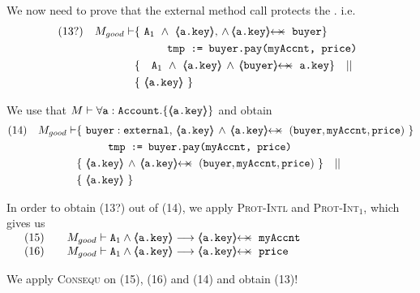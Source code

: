 \begin{proofO}

 

We now need to prove that the external method call  protects the . i.e.
\begin{align*}
\text{(13?)} \ \ \ M_{good} \vdash & \{ \ \Alocalsb \   \wedge\    {\inside{\prg{a.key}}},\, \wedge\, \protectedFrom {\prg{a.key}} {\prg{buyer}}  \} \\
		  		& \SPT  \prg{tmp := buyer.pay(myAccnt, price)}\ \\  
		  		& \{ \ \ \ \Alocalsb \ \wedge\ {\inside{\prg{a.key}}} \, \wedge\, \protectedFrom{\prg{buyer}} {\prg{a.key}} \} \ \ \  || \ \ \  \\
		  		&   \{ \   {\inside{\prg{a.key}}}\  \}
\end{align*}
\normalsize

We use that $M \vdash \forall {\mbox{\normalfont{\texttt{a}}}:\mbox{\normalfont{\texttt{Account}}}}.{{\{}}{\langle\!\!\langle \mbox{\normalfont{\texttt{a.key}}} \rangle\!\!\rangle}{{\}}}$
 and  obtain
 \\
 \small
\begin{align*}
\text{(14)} \ \ \ M_{good} \vdash & \{ \ \prg{buyer}:\prg{external},\,  {\inside{\prg{a.key}}} \, \wedge\, 
\protectedFrom {\prg{a.key}} {(\prg{buyer},\prg{myAccnt},\prg{price})} \  \} \\
		  		& \SPT  \prg{tmp := buyer.pay(myAccnt, price)}\ \\  
		  		& \{ \ \inside{\prg{a.key}} \, \wedge\, 
\protectedFrom {\prg{a.key}} {(\prg{buyer},\prg{myAccnt},\prg{price})}\ \} \ \ \  || \ \ \  \\
		  		&   \{ \   {\inside{\prg{a.key}}}\  \}
\end{align*}
\normalsize 
 
In order to obtain (13?) out of (14), we apply \textsc{Prot-Intl} and \textsc{Prot-Int}$_1$,   which gives us\\
$
\begin{array}{llll}
& (15) & & M_{good} \vdash \Alocalsb \wedge  {\inside{\prg{a.key}}}  \longrightarrow \protectedFrom {\prg{a.key}} {\prg{myAccnt}} 
\\
& (16) & & M_{good} \vdash \Alocalsb \wedge  {\inside{\prg{a.key}}}  \longrightarrow \protectedFrom {\prg{a.key}} {\prg{price}} 
\end{array}
$

We apply {\textsc{Consequ}} on (15), (16) and (14) and obtain (13)!

\normalsize


\end{proofO}

